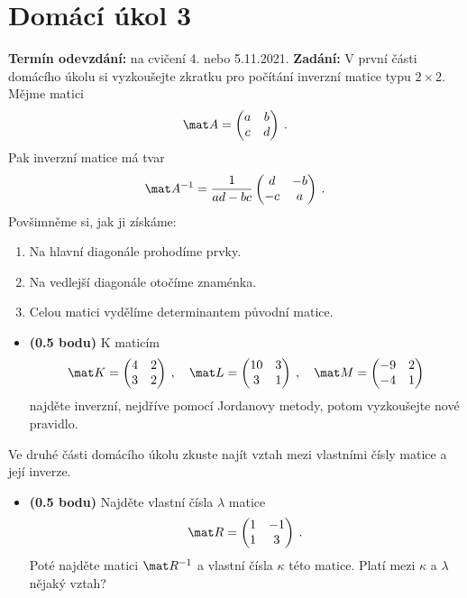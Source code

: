\section*{Domácí úkol 3}
\textbf{Termín odevzdání:} na cvičení 4. nebo 5.11.2021.
\newline
\textbf{Zadání:} V první části domácího úkolu si vyzkoušejte zkratku pro počítání inverzní matice typu $2 \times 2$. Mějme matici \begin{align}
    \mat A = \begin{pmatrix}
        a & b \\ c & d
    \end{pmatrix} \:.
\end{align}
Pak inverzní matice má tvar
\begin{align}
    \mat A^{-1} = \frac{1}{ad-bc} \begin{pmatrix}
        d & -b \\ -c & a 
    \end{pmatrix} \:.
\end{align}
Povšimněme si, jak ji získáme:
\begin{enumerate}
    \item Na hlavní diagonále prohodíme prvky.
    \item Na vedlejší diagonále otočíme znaménka.
    \item Celou matici vydělíme determinantem původní matice.
\end{enumerate}

\begin{itemize}
    \item \textbf{(0.5 bodu)} K maticím
    \begin{align}
        \mat K = \begin{pmatrix}
            4 & 2 \\ 3 & 2
        \end{pmatrix} \:,\quad
        \mat L = \begin{pmatrix}
            10 & 3 \\ 3& 1
        \end{pmatrix} \:,\quad
        \mat M = \begin{pmatrix}
            -9 & 2 \\ -4 & 1
        \end{pmatrix}
    \end{align}
    najděte inverzní, nejdříve pomocí Jordanovy metody, potom vyzkoušejte nové pravidlo.
\end{itemize}

Ve druhé části domácího úkolu zkuste najít vztah mezi vlastními čísly matice a její inverze.
\begin{itemize}
    \item \textbf{(0.5 bodu)} Najděte vlastní čísla $\lambda$ matice \begin{align}
        \mat R = \begin{pmatrix}
            1 & -1 \\ 1 & 3
        \end{pmatrix} \:.
    \end{align}
    Poté najděte matici $\mat R^{-1}$ a vlastní čísla $\kappa$ této matice. Platí mezi $\kappa$ a $\lambda$ nějaký vztah?
\end{itemize}

